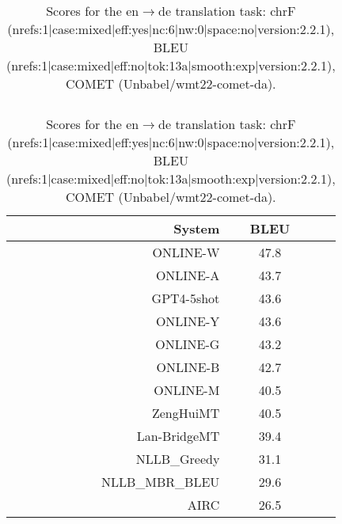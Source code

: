 \documentclass[11pt]{article}
\begin{document}
\begin{table}
\begin{subtable}[t]{0.33\textwidth}
\begin{tabular}{rcc}
\end{tabular} 
\end{subtable} 
\begin{subtable}[t]{0.33\textwidth}
\begin{tabular}{rcc}
\toprule 
System  & BLEU \\ 
\midrule 
\rowcolor{ashgrey} ONLINE-W   & 47.8 \\ 
\rowcolor{ashgrey} ONLINE-A   & 43.7 \\ 
\rowcolor{ashgrey} GPT4-5shot  & 43.6 \\ 
\rowcolor{ashgrey} ONLINE-Y   & 43.6 \\ 
\rowcolor{ashgrey} ONLINE-G   & 43.2 \\ 
\rowcolor{ashgrey} ONLINE-B   & 42.7 \\ 
\rowcolor{ashgrey} ONLINE-M   & 40.5 \\ 
\rowcolor{ashgrey} ZengHuiMT   & 40.5 \\ 
\rowcolor{ashgrey} Lan-BridgeMT   & 39.4 \\ 
\rowcolor{ashgrey} NLLB\_Greedy   & 31.1 \\ 
\rowcolor{ashgrey} NLLB\_MBR\_BLEU   & 29.6 \\ 
AIRC &   26.5 \\ 
\bottomrule 
\end{tabular} 
\end{subtable} 
 
\caption{Scores for the en$\rightarrow$de translation task: chrF (nrefs:1|case:mixed|eff:yes|nc:6|nw:0|space:no|version:2.2.1), BLEU (nrefs:1|case:mixed|eff:no|tok:13a|smooth:exp|version:2.2.1), COMET (Unbabel/wmt22-comet-da).} 
\end{table} 
\end{document}
